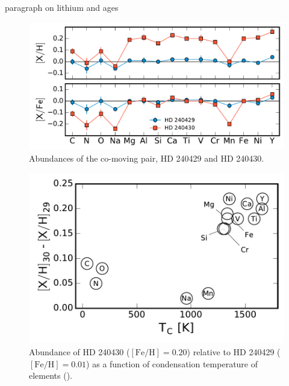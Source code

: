 \documentclass[manuscript]{aastex6}
\begin{document}
paragraph on lithium and ages

\begin{figure}[htpb]
  \centering
  \includegraphics[width=0.9\linewidth]{abundances.pdf}
  \caption{Abundances of the co-moving pair, HD 240429 and HD 240430.}
  \label{fig:abundances}
\end{figure}

\begin{figure}[htpb]
  \centering
  \includegraphics[width=0.9\linewidth]{relabun_tc_XH.pdf}
  \caption{Abundance of HD 240430 ($[\mathrm{Fe}/\mathrm{H}] = 0.20$)
    relative to HD 240429 ($[\mathrm{Fe}/\mathrm{H}] = 0.01$)
    as a function of condensation temperature of elements (\citealt{2003ApJ...591.1220L}).
  }
  \label{fig:relabun_tc}
\end{figure}
\end{document}
